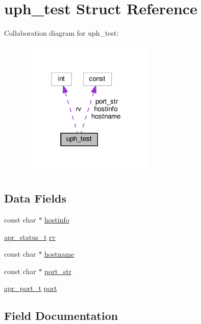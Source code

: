 \hypertarget{structuph__test}{}\section{uph\+\_\+test Struct Reference}
\label{structuph__test}


Collaboration diagram for uph\+\_\+test\+:
\nopagebreak
\begin{figure}[H]
\begin{center}
\leavevmode
\includegraphics[width=182pt]{structuph__test__coll__graph}
\end{center}
\end{figure}
\subsection*{Data Fields}
\begin{DoxyCompactItemize}
\item 
const char $\ast$ \hyperlink{structuph__test_ad9ed1e156d8a96df2b48b13f63d42803}{hostinfo}
\item 
\hyperlink{group__apr__errno_gaa5105fa83cc322f09382292db8b47593}{apr\+\_\+status\+\_\+t} \hyperlink{structuph__test_adcc99b1a1f03c9d87ebb16de65ce4b5f}{rv}
\item 
const char $\ast$ \hyperlink{structuph__test_ae9be3a087878b54c338515406ebbe30f}{hostname}
\item 
const char $\ast$ \hyperlink{structuph__test_a5ef648564afee80e2fd28b0ef178d361}{port\+\_\+str}
\item 
\hyperlink{group__apr__network__io_gaa670a71960f6eb4fe0d0de2a1e7aba03}{apr\+\_\+port\+\_\+t} \hyperlink{structuph__test_abeb24b11057a23a56ad22748e1001270}{port}
\end{DoxyCompactItemize}


\subsection{Field Documentation}
